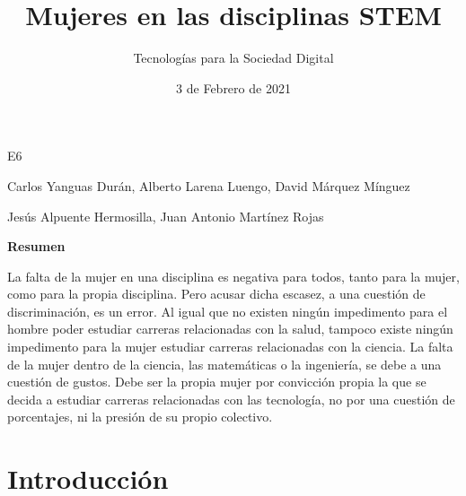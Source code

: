  

 

\graphicspath{{../Book/figures/}}

\title{Mujeres en las disciplinas STEM}
\date{3 de Febrero de 2021}            
\author{Tecnologías para la Sociedad Digital}




\maketitle
\begin{description}                               
  {        
  \item[Título en inglés:] \mybooktitleenglish   
  }                                            
  {                                           
  }                                              
\item[Equipo:] E6 
\item[Autores:] Carlos Yanguas Durán, Alberto Larena Luengo, David Márquez Mínguez                 
\item[\expandafter\makefirstuc\expandafter{\mybookTutorOrTutores}:] Jesús Alpuente Hermosilla, Juan Antonio Martínez Rojas      
\end{description}      
\setcounter{page}{1}


\begin{center}
 {\bfseries \Large Resumen}
\end{center}
La falta de la mujer en una disciplina es negativa para todos, tanto para la mujer, como para la propia disciplina. Pero acusar dicha escasez, a una cuestión de discriminación, es un error. Al igual que no existen ningún impedimento para el hombre poder estudiar carreras relacionadas con la salud, tampoco existe ningún impedimento para la mujer estudiar carreras relacionadas con la ciencia. La falta de la mujer dentro de la ciencia, las matemáticas o la ingeniería, se debe a una cuestión de gustos. Debe ser la propia mujer por convicción propia la que se decida a estudiar carreras relacionadas con las tecnología, no por una cuestión de porcentajes, ni la presión de su propio colectivo. 

                   

\section{Introducción}
\label{sec:introduccion}


